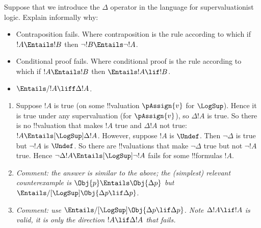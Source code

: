 \documentclass[../../../../include/open-logic-chapter]{subfiles}
\begin{document}
\begin{prob}
	Suppose that we introduce the $\Delta$ operator in the language for supervaluationist logic. Explain informally why:
	\begin{itemize}
		\item Contraposition fails. Where contraposition is the rule according to which if $!A \Entails !B$ then $\lnot !B \Entails \lnot !A$.
		\item Conditional proof fails. Where conditional proof is the rule according to which if $!A \Entails !B$ then $\Entails !A \lif !B$.
		\item $\Entails/ !A \liff \Delta !A$.
	\end{itemize}

\begin{ans}
\begin{enumerate}
\item Suppose $!A$ is true (on some !!{valuation} $\pAssign{v}$ for $\LogSup$). Hence it is true under any supervaluation (for $\pAssign{v}$), so $\Delta !A$ is true. So there is no !!{valuation} that makes $!A$ true and $\Delta !A$ not true: $!A \Entails[\LogSup] \Delta !A$. However, suppose $!A$ is $\Undef$. Then $\lnot \Delta$ is true but $\lnot !A$ is $\Undef$. So there are !!{valuation}s that make $\lnot \Delta$ true but not $\lnot !A$ true. Hence $\lnot \Delta !A \Entails[\LogSup] \lnot !A$ fails for some !!{formula}s $!A$. 
\item \emph{Comment: the answer is similar to the above; the (simplest) relevant counterexample is $\Obj{p} \Entails \Obj{\Delta p}$ but  $\Entails/[\LogSup]  \Obj{\Delta p \lif \Delta p}$}. 
\item \emph{Comment: use $\Entails/[\LogSup] \Obj{\Delta p \lif \Delta p}$. Note $\Delta !A \lif !A$ is valid, it is only the direction $!A \lif \Delta !A$ that fails.}
\end{enumerate}
\end{ans}
\end{prob}

\OLEndChapterHook
\end{document}
